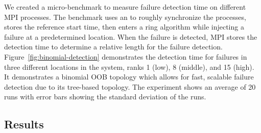 We created a micro-benchmark to measure failure detection time on different MPI
processes. The benchmark uses an  to roughly synchronize
the processes, stores the reference start time, then enters a ring algorithm
while injecting a failure at a predetermined location. When the failure is
detected, MPI stores the detection time to determine a relative length for the
failure detection. Figure~\ref{fig:binomial-detection} demonstrates the
detection time for failures in three different locations in the system, ranks 1
(low), 8 (middle), and 15 (high). It demonstrates a binomial OOB topology which
allows for fast, scalable failure detection due to its tree-based topology. The
experiment shows an average of 20 runs with error bars showing the standard
deviation of the runs.


\subsection{\cof Results}\label{subsect:cof-results}

